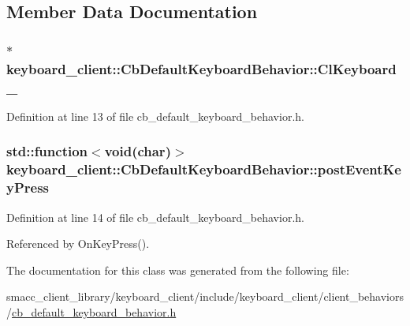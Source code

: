 \subsection{Member Data Documentation}
\subsubsection[{\texorpdfstring{Cl\+Keyboard\+\_\+}{ClKeyboard_}}]{$\ast$ keyboard\+\_\+client\+::\+Cb\+Default\+Keyboard\+Behavior\+::\+Cl\+Keyboard\+\_\+}\hypertarget{classkeyboard__client_1_1CbDefaultKeyboardBehavior_a17c088cabe2d686f227d2a6368629993}{}\label{classkeyboard__client_1_1CbDefaultKeyboardBehavior_a17c088cabe2d686f227d2a6368629993}


Definition at line 13 of file cb\+\_\+default\+\_\+keyboard\+\_\+behavior.\+h.

\subsubsection[{\texorpdfstring{post\+Event\+Key\+Press}{postEventKeyPress}}]{\setlength{\rightskip}{0pt plus 5cm}std\+::function$<$void(char)$>$ keyboard\+\_\+client\+::\+Cb\+Default\+Keyboard\+Behavior\+::post\+Event\+Key\+Press}\hypertarget{classkeyboard__client_1_1CbDefaultKeyboardBehavior_ac3a5e8c2cca0fd4117ddc192858d3771}{}\label{classkeyboard__client_1_1CbDefaultKeyboardBehavior_ac3a5e8c2cca0fd4117ddc192858d3771}


Definition at line 14 of file cb\+\_\+default\+\_\+keyboard\+\_\+behavior.\+h.



Referenced by On\+Key\+Press().



The documentation for this class was generated from the following file\+:\begin{DoxyCompactItemize}
\item 
smacc\+\_\+client\+\_\+library/keyboard\+\_\+client/include/keyboard\+\_\+client/client\+\_\+behaviors/\hyperlink{cb__default__keyboard__behavior_8h}{cb\+\_\+default\+\_\+keyboard\+\_\+behavior.\+h}\end{DoxyCompactItemize}
